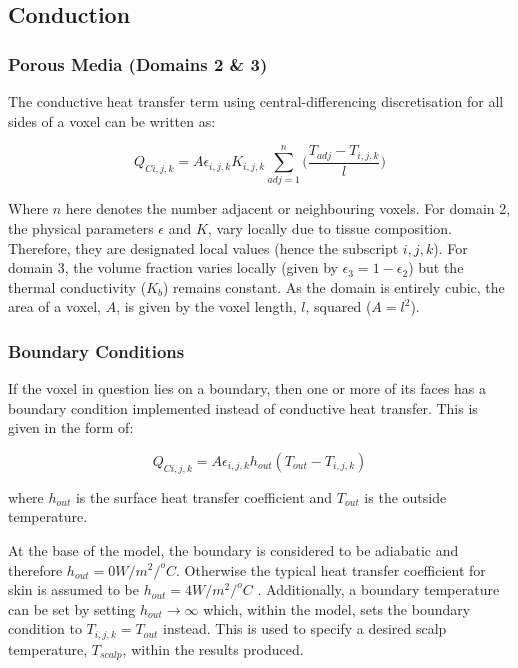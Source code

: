 \documentclass[11pt,english,a4paper,twoside,openright]{report}
\begin{document}
{{{{{{{{\subsection{Conduction}

\subsubsection{Porous Media (Domains 2 \& 3)}

The conductive heat transfer term using central-differencing discretisation for all sides of a voxel can be written as:

\begin{equation}
\label{Eq:Conduction2}
Q_{Ci,j,k}=A\epsilon_{i,j,k}K_{i,j,k} \sum_{adj=1}^{n}\bigg(\frac{T_{adj}-T_{i,j,k}}{l}\bigg)
\end{equation}

Where $n$ here denotes the number adjacent or neighbouring voxels. For domain 2, the physical parameters $\epsilon$ and $K$, vary locally due to tissue composition. Therefore, they are designated local values (hence the subscript $i,j,k$). For domain 3, the volume fraction varies locally (given by $\epsilon_{3}=1-\epsilon_{2}$) but the thermal conductivity ($K_{b}$) remains constant. As the domain is entirely cubic, the area of a voxel, $A$, is given by the voxel length, $l$, squared ($A=l^{2}$).

\subsubsection{Boundary Conditions}

If the voxel in question lies on a boundary, then one or more of its faces has a boundary condition implemented instead of conductive heat transfer. This is given in the form of:

\begin{equation}
\label{Eq:Boundary}
Q_{Ci,j,k}=A\epsilon_{i,j,k}h_{out}(T_{out}-T_{i,j,k})
\end{equation}

where $h_{out}$ is the surface heat transfer coefficient and $T_{out}$ is the outside temperature.

At the base of the model, the boundary is considered to be adiabatic and therefore $h_{out}=0W/m^{2}/^{o}C$. Otherwise the typical heat transfer coefficient for skin is assumed to be $h_{out}=4W/m^{2}/^{o}C$ \cite{nelson1998brain}. Additionally, a boundary temperature can be set by setting $h_{out}\rightarrow\infty$ which, within the model, sets the boundary condition to $T_{i,j,k}=T_{out}$ instead. This is used to specify a desired scalp temperature, $T_{scalp}$, within the results produced.

}}}}}}}}
\end{document}
